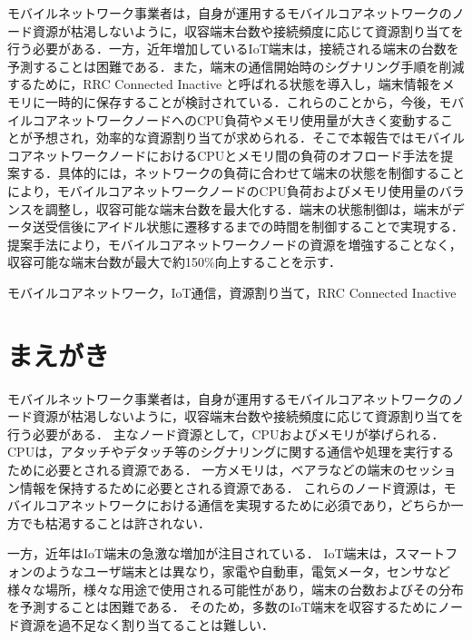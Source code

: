 \documentclass[technicalreport]{ieicej-rev}
\begin{document}
\begin{jabstract}
モバイルネットワーク事業者は，自身が運用するモバイルコアネットワークのノード資源が枯渇しないように，収容端末台数や接続頻度に応じて資源割り当てを行う必要がある．一方，近年増加しているIoT端末は，接続される端末の台数を予測することは困難である．また，端末の通信開始時のシグナリング手順を削減するために，RRC Connected Inactive と呼ばれる状態を導入し，端末情報をメモリに一時的に保存することが検討されている．これらのことから，今後，モバイルコアネットワークノードへのCPU負荷やメモリ使用量が大きく変動することが予想され，効率的な資源割り当てが求められる．そこで本報告ではモバイルコアネットワークノードにおけるCPUとメモリ間の負荷のオフロード手法を提案する．具体的には，ネットワークの負荷に合わせて端末の状態を制御することにより，モバイルコアネットワークノードのCPU負荷およびメモリ使用量のバランスを調整し，収容可能な端末台数を最大化する．端末の状態制御は，端末がデータ送受信後にアイドル状態に遷移するまでの時間を制御することで実現する．提案手法により，モバイルコアネットワークノードの資源を増強することなく，収容可能な端末台数が最大で約150\%向上することを示す．
\end{jabstract}
\begin{jkeyword}
モバイルコアネットワーク，IoT通信，資源割り当て，RRC Connected Inactive
\end{jkeyword}
\maketitle


\section{まえがき}
\label{sec:abs}
モバイルネットワーク事業者は，自身が運用するモバイルコアネットワークのノード資源が枯渇しないように，収容端末台数や接続頻度に応じて資源割り当てを行う必要がある．
主なノード資源として，CPUおよびメモリが挙げられる．
CPUは，アタッチやデタッチ等のシグナリングに関する通信や処理を実行するために必要とされる資源である．
一方メモリは，ベアラなどの端末のセッション情報を保持するために必要とされる資源である．
これらのノード資源は，モバイルコアネットワークにおける通信を実現するために必須であり，どちらか一方でも枯渇することは許されない．


一方，近年はIoT端末の急激な増加が注目されている．
IoT端末は，スマートフォンのようなユーザ端末とは異なり，家電や自動車，電気メータ，センサなど様々な場所，様々な用途で使用される可能性があり，端末の台数およびその分布を予測することは困難である．
そのため，多数のIoT端末を収容するためにノード資源を過不足なく割り当てることは難しい．
\end{document}
